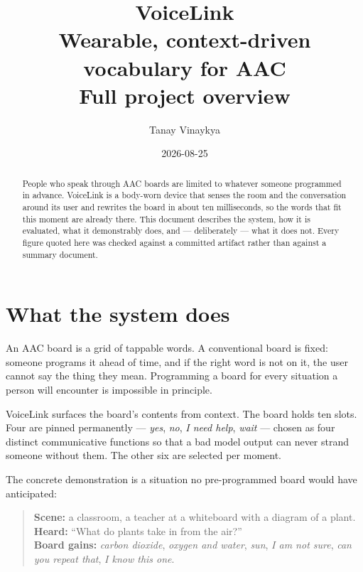 \documentclass[11pt,a4paper]{article}
\title{\vspace{-1.5cm}\textbf{VoiceLink}\\[2pt]
\large Wearable, context-driven vocabulary for AAC\\[6pt]
\normalsize Full project overview}
\author{Tanay Vinaykya}
\date{2026-08-25}
\begin{document}
\maketitle
\thispagestyle{empty}

\begin{abstract}
\noindent People who speak through AAC boards are limited to whatever someone
programmed in advance. VoiceLink is a body-worn device that senses the room and the
conversation around its user and rewrites the board in about ten milliseconds, so the
words that fit this moment are already there. This document describes the system, how
it is evaluated, what it demonstrably does, and --- deliberately --- what it does not.
Every figure quoted here was checked against a committed artifact rather than against a
summary document.
\end{abstract}

\vspace{-0.3cm}
\tableofcontents
\vspace{0.4cm}

\section{What the system does}

An AAC board is a grid of tappable words. A conventional board is fixed: someone
programs it ahead of time, and if the right word is not on it, the user cannot say the
thing they mean. Programming a board for every situation a person will encounter is
impossible in principle.

VoiceLink surfaces the board's contents from context. The board holds ten slots. Four
are pinned permanently --- \emph{yes}, \emph{no}, \emph{I need help}, \emph{wait} ---
chosen as four distinct communicative functions so that a bad model output can never
strand someone without them. The other six are selected per moment.

The concrete demonstration is a situation no pre-programmed board would have anticipated:

\begin{quote}
\textbf{Scene:} a classroom, a teacher at a whiteboard with a diagram of a plant.\\
\textbf{Heard:} ``What do plants take in from the air?''\\
\textbf{Board gains:} \emph{carbon dioxide}, \emph{oxygen and water}, \emph{sun},
\emph{I am not sure}, \emph{can you repeat that}, \emph{I know this one}.
\end{quote}
\end{document}
